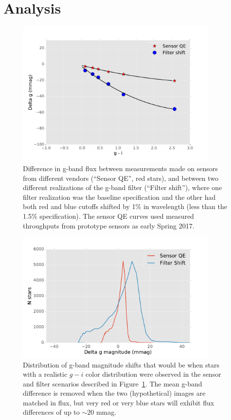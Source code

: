 \documentclass[12pt]{article}
\begin{document}
\section{Analysis}
\begin{figure}
\includegraphics[width=0.9\textwidth]{figures/delta_g_vs_color.pdf}
\caption{Difference in g-band flux between measurements made on sensors from
different vendors (``Sensor QE'', red stars), and between two different
realizations of the g-band filter (``Filter shift''), where one filter
realization was the baseline specification and the other had both red and blue
cutoffs shifted by 1\% in wavelength (less than the 1.5\% specification). The
sensor QE curves used measured throughputs from prototype sensors as early
Spring 2017.
\label{fig:delta_g_vs_color}}
\end{figure}

\begin{figure}
\includegraphics[width=0.9\textwidth]{figures/delta_g_histogram.pdf}
\caption{Distribution of g-band magnitude shifts that would be when stars with a
realistic $g-i$ color distribution were observed in the sensor and filter
scenarios described in Figure~\ref{fig:delta_g_vs_color}. The mean g-band
difference is removed when the two (hypothetical) images are matched in flux,
but very red or very blue stars will exhibit flux differences of up to $\sim 20$
mmag.
\label{fig:delta_g_histogram}}
\end{figure}
\end{document}
